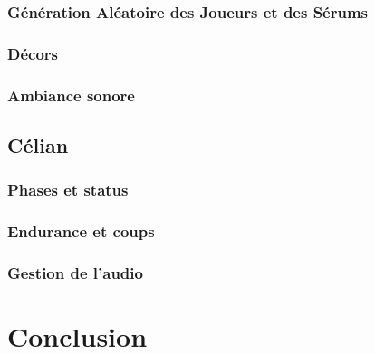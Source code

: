 \documentclass{article}
\begin{document}
\subsubsection{Génération Aléatoire des Joueurs et des Sérums}

\subsubsection{Décors}

\subsubsection{Ambiance sonore}

\subsection{Célian}

\subsubsection{Phases et status}

\subsubsection{Endurance et coups}

\subsubsection{Gestion de l'audio}

\section{Conclusion}
\end{document}
